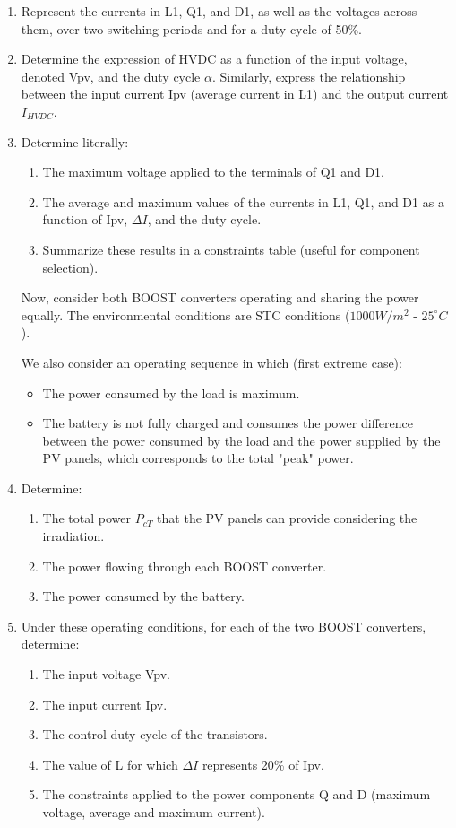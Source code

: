 \begin{enumerate}
\item Represent the currents in L1, Q1, and D1, as well as the voltages across them, over two switching periods and for a duty cycle of 50\%.

\item Determine the expression of HVDC as a function of the input voltage, denoted Vpv, and the duty cycle $\alpha$. Similarly, express the relationship between the input current Ipv (average current in L1) and the output current $I_{HVDC}$.

\item Determine literally:
\begin{enumerate}
\item The maximum voltage applied to the terminals of Q1 and D1.
\item The average and maximum values of the currents in L1, Q1, and D1 as a function of Ipv, $\Delta I$, and the duty cycle.
\item Summarize these results in a constraints table (useful for component selection).
\end{enumerate}

Now, consider both BOOST converters operating and sharing the power equally. The environmental conditions are STC conditions ($1000 W/m^2$ - $25^\circ C$).

We also consider an operating sequence in which (first extreme case):
\begin{itemize}
\item The power consumed by the load is maximum.
\item The battery is not fully charged and consumes the power difference between the power consumed by the load and the power supplied by the PV panels, which corresponds to the total "peak" power.
\end{itemize}

\item Determine:
\begin{enumerate}
\item The total power $P_{cT}$ that the PV panels can provide considering the irradiation.
\item The power flowing through each BOOST converter.
\item The power consumed by the battery.
\end{enumerate}

\item Under these operating conditions, for each of the two BOOST converters, determine:
\begin{enumerate}
\item The input voltage Vpv.
\item The input current Ipv.
\item The control duty cycle of the transistors.
\item The value of L for which $\Delta I$ represents 20\% of Ipv.
\item The constraints applied to the power components Q and D (maximum voltage, average and maximum current).
\end{enumerate}


\end{enumerate}
